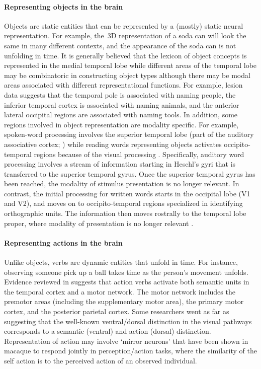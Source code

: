 \paragraph{Representing objects in the brain}
%
Objects are static entities that can be represented by a (mostly) static
neural representation.
%
For example, the~3D representation of a soda can will look the same in many
different contexts, and the appearance of the soda can is not unfolding in
time.
%
It is generally believed that the lexicon of object concepts is represented in
the medial temporal lobe while different areas of the temporal lobe may be
combinatoric in constructing object types \citep{hanson2004combinatorial}
although there may be modal areas associated with different representational
functions.
%
For example, lesion data suggests that the temporal pole is associated with
naming people, the inferior temporal cortex is associated with naming
animals, and the anterior lateral occipital regions are associated with naming
tools.
%
In addition, some regions involved in object representation are
modality specific.
%
For example, spoken-word processing involves the superior temporal lobe (part
of the auditory associative cortex; \citealp{binder2000human}) while reading
words representing objects activates occipito-temporal regions because of the
visual processing \citep{puce1996differential}.
%
Specifically, auditory word processing involves a stream of information
starting in Heschl's gyri that is transferred to the superior temporal gyrus.
%
Once the superior temporal gyrus has been reached, the modality of stimulus
presentation is no longer relevant.
%
In contrast, the initial processing for written words starts in the occipital
lobe (V1 and V2), and moves on to occipito-temporal regions specialized in
identifying orthographic units.
%
The information then moves rostrally to the temporal lobe proper, where
modality of presentation is no longer relevant \citep{binder2000human}.

\vspace*{-2.4ex}
\paragraph{Representing actions in the brain}
%
Unlike objects, verbs are dynamic entities that unfold in time.
%
For instance, observing someone pick up a ball takes time as the person's
movement unfolds.
%
Evidence reviewed in \citet{coello2012motor} suggests that action verbs
activate both semantic units in the temporal cortex and a motor network.
%
The motor network includes the premotor areas (including the supplementary
motor area), the primary motor cortex, and the posterior parietal cortex.
%
Some researchers went as far as suggesting that the well-known ventral/dorsal
distinction in the visual pathways corresponds to a semantic (ventral) and
action (dorsal) distinction.
%
Representation of action may involve `mirror neurons' that have been shown in
macaque to respond jointly in perception/action tasks, where the similarity of
the self action is to the perceived action of an observed individual.

